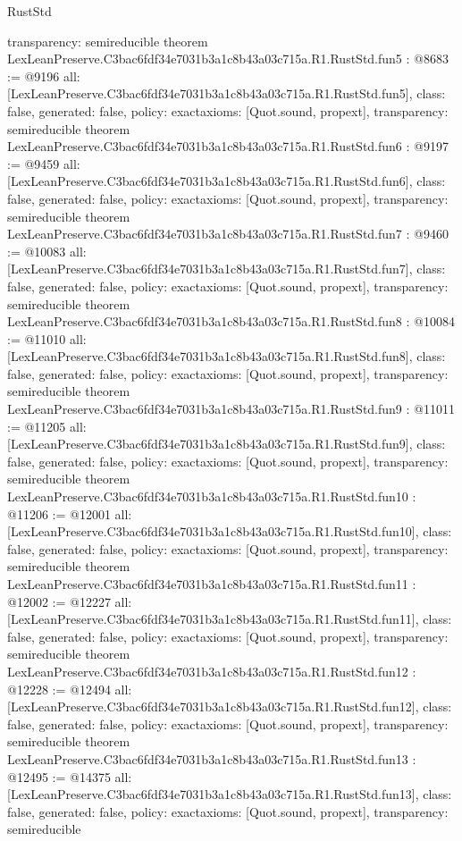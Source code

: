 \begin{lexlean}{RustStd}
\begin{coremodule}
{  transparency: semireducible
}
theorem LexLeanPreserve.C3bac6fdf34e7031b3a1c8b43a03c715a.R1.RustStd.fun5 : @8683 := @9196 {
  all: [LexLeanPreserve.C3bac6fdf34e7031b3a1c8b43a03c715a.R1.RustStd.fun5],
  class: false,
  generated: false,
  policy: exact{axioms: [Quot.sound, propext]},
  transparency: semireducible
}
theorem LexLeanPreserve.C3bac6fdf34e7031b3a1c8b43a03c715a.R1.RustStd.fun6 : @9197 := @9459 {
  all: [LexLeanPreserve.C3bac6fdf34e7031b3a1c8b43a03c715a.R1.RustStd.fun6],
  class: false,
  generated: false,
  policy: exact{axioms: [Quot.sound, propext]},
  transparency: semireducible
}
theorem LexLeanPreserve.C3bac6fdf34e7031b3a1c8b43a03c715a.R1.RustStd.fun7 : @9460 := @10083 {
  all: [LexLeanPreserve.C3bac6fdf34e7031b3a1c8b43a03c715a.R1.RustStd.fun7],
  class: false,
  generated: false,
  policy: exact{axioms: [Quot.sound, propext]},
  transparency: semireducible
}
theorem LexLeanPreserve.C3bac6fdf34e7031b3a1c8b43a03c715a.R1.RustStd.fun8 : @10084 := @11010 {
  all: [LexLeanPreserve.C3bac6fdf34e7031b3a1c8b43a03c715a.R1.RustStd.fun8],
  class: false,
  generated: false,
  policy: exact{axioms: [Quot.sound, propext]},
  transparency: semireducible
}
theorem LexLeanPreserve.C3bac6fdf34e7031b3a1c8b43a03c715a.R1.RustStd.fun9 : @11011 := @11205 {
  all: [LexLeanPreserve.C3bac6fdf34e7031b3a1c8b43a03c715a.R1.RustStd.fun9],
  class: false,
  generated: false,
  policy: exact{axioms: [Quot.sound, propext]},
  transparency: semireducible
}
theorem LexLeanPreserve.C3bac6fdf34e7031b3a1c8b43a03c715a.R1.RustStd.fun10 : @11206 := @12001 {
  all: [LexLeanPreserve.C3bac6fdf34e7031b3a1c8b43a03c715a.R1.RustStd.fun10],
  class: false,
  generated: false,
  policy: exact{axioms: [Quot.sound, propext]},
  transparency: semireducible
}
theorem LexLeanPreserve.C3bac6fdf34e7031b3a1c8b43a03c715a.R1.RustStd.fun11 : @12002 := @12227 {
  all: [LexLeanPreserve.C3bac6fdf34e7031b3a1c8b43a03c715a.R1.RustStd.fun11],
  class: false,
  generated: false,
  policy: exact{axioms: [Quot.sound, propext]},
  transparency: semireducible
}
theorem LexLeanPreserve.C3bac6fdf34e7031b3a1c8b43a03c715a.R1.RustStd.fun12 : @12228 := @12494 {
  all: [LexLeanPreserve.C3bac6fdf34e7031b3a1c8b43a03c715a.R1.RustStd.fun12],
  class: false,
  generated: false,
  policy: exact{axioms: [Quot.sound, propext]},
  transparency: semireducible
}
theorem LexLeanPreserve.C3bac6fdf34e7031b3a1c8b43a03c715a.R1.RustStd.fun13 : @12495 := @14375 {
  all: [LexLeanPreserve.C3bac6fdf34e7031b3a1c8b43a03c715a.R1.RustStd.fun13],
  class: false,
  generated: false,
  policy: exact{axioms: [Quot.sound, propext]},
  transparency: semireducible
}
\end{coremodule}
\end{lexlean}
